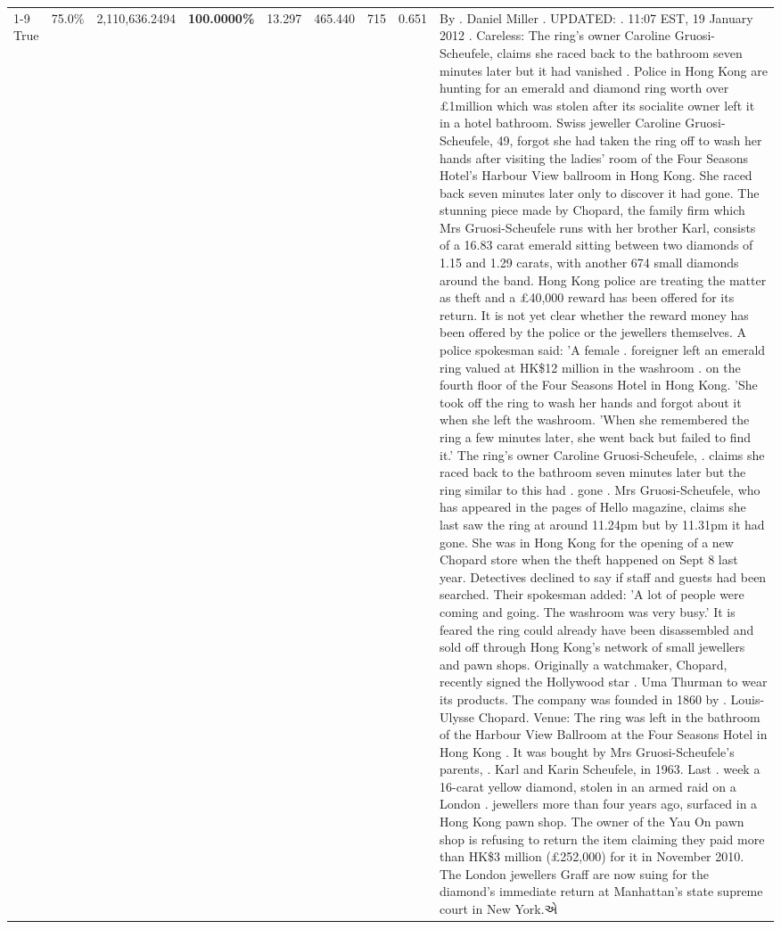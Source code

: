 \begin{table}[H]
\begin{tabular}{lllrlllll}
\cline{1-9}
True & 75.0\% & 2,110,636.2494 & \bfseries \color{red} 100.0000\% & 13.297 & 465.440 & 715 & 0.651 & By . Daniel Miller . UPDATED: . 11:07 EST, 19 January 2012 . Careless: The ring's owner Caroline Gruosi-Scheufele, claims she raced back to the bathroom seven minutes later but it had vanished . Police in Hong Kong are hunting for an emerald and diamond ring worth over £1million which was stolen after its socialite owner left it in a hotel bathroom. Swiss jeweller Caroline Gruosi-Scheufele, 49, forgot she had taken the ring off to wash her hands after visiting the ladies' room of the Four Seasons Hotel's Harbour View ballroom in Hong Kong. She raced back seven minutes later only to discover it had gone. The stunning piece made by Chopard, the family firm which Mrs Gruosi-Scheufele runs with her brother Karl, consists of a 16.83 carat emerald sitting between two diamonds of 1.15 and 1.29 carats, with another 674 small diamonds around the band. Hong Kong police are treating the matter as theft and a £40,000 reward has been offered for its return. It is not yet clear whether the reward money has been offered by the police or the jewellers themselves. A police spokesman said: 'A female . foreigner left an emerald ring valued at HK\$12 million in the washroom . on the fourth floor of the Four Seasons Hotel in Hong Kong. 'She took off the ring to wash her hands and forgot about it when she left the washroom. 'When she remembered the ring a few minutes later, she went back but failed to find it.' The ring's owner Caroline Gruosi-Scheufele, . claims she raced back to the bathroom seven minutes later but the ring similar to this had . gone . Mrs Gruosi-Scheufele, who has appeared in the pages of Hello magazine, claims she last saw the ring at around 11.24pm but by 11.31pm it had gone. She was in Hong Kong for the opening of a new Chopard store when the theft happened on Sept 8 last year. Detectives declined to say if staff and guests had been searched. Their spokesman added: 'A lot of people were coming and going. The washroom was very busy.' It is feared the ring could already have been disassembled and sold off through Hong Kong's network of small jewellers and pawn shops. Originally a watchmaker, Chopard, recently signed the Hollywood star . Uma Thurman to wear its products. The company was founded in 1860 by . Louis-Ulysse Chopard. Venue: The ring was left in the bathroom of the Harbour View Ballroom at the Four Seasons Hotel in Hong Kong . It was bought by Mrs Gruosi-Scheufele's  parents, . Karl and Karin Scheufele, in 1963. Last . week a 16-carat yellow diamond, stolen in an armed raid on a London . jewellers more than four years ago, surfaced in a Hong Kong pawn shop. The owner of the Yau On pawn shop is refusing to return the item claiming they paid more than HK\$3 million (£252,000) for it in November 2010. The London jewellers Graff are now suing for the diamond’s immediate return at Manhattan’s state supreme court in New York.એ \\

\end{tabular}
\end{table}
